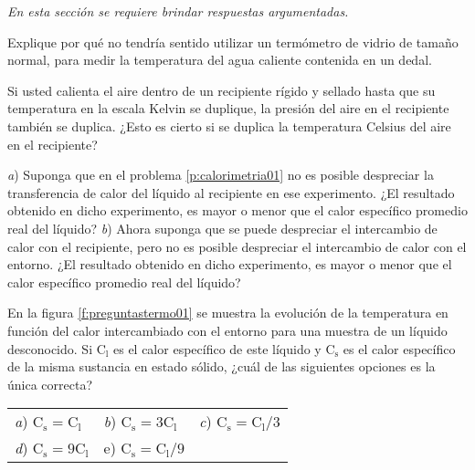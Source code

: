 \textit{En esta sección se requiere brindar respuestas argumentadas.}
\setcounter{figure}{0}
%
\begin{Exercise}
  Explique por qué no tendría sentido utilizar un termómetro de vidrio de tamaño normal, para medir la temperatura del agua caliente contenida en un dedal.
\end{Exercise}
%
\begin{Exercise}
  Si usted calienta el aire dentro de un recipiente rígido y sellado hasta que su temperatura en la escala Kelvin se duplique, la presión del aire en el recipiente también se duplica. ¿Esto es cierto si se duplica la temperatura Celsius del aire en el recipiente?
\end{Exercise}
%
\begin{Exercise}
  \textit{a}) Suponga que en el problema \ref{p:calorimetria01} no es posible despreciar la transferencia de calor del líquido al recipiente en ese experimento. ¿El resultado obtenido en dicho experimento, es mayor o menor que el calor específico promedio real del líquido? \textit{b}) Ahora suponga que se puede despreciar el intercambio de calor con el recipiente, pero no es posible despreciar el intercambio de calor con el entorno. ¿El resultado obtenido en dicho experimento, es mayor o menor que el calor específico promedio real del líquido?
\end{Exercise}
%
\begin{Exercise}\label{p:preguntastermo01}
  {}{}
  En la figura \ref{f:preguntastermo01} se muestra la evolución de la temperatura en función del calor intercambiado con el entorno para una muestra de un líquido desconocido. Si $\text{C}_{\text{l}}$ es el calor específico de este líquido y $\text{C}_{\text{s}}$ es el calor específico de la misma sustancia en estado sólido, ¿cuál de las siguientes opciones es la única correcta?\\
\renewcommand{\arraystretch}{1.5}
  \begin{tabular}{p{2.5cm} p{2.5cm} p{2.5cm}}
     \textit{a}) $\text{C}_{\text{s}}=\text{C}_{\text{l}}$ & \textit{b}) $\text{C}_{\text{s}}=3\text{C}_{\text{l}}$ & \textit{c}) $\text{C}_{\text{s}}=\text{C}_{\text{l}}/3$ \\
     \textit{d}) $\text{C}_{\text{s}}=9\text{C}_{\text{l}}$ & e) $\text{C}_{\text{s}}=\text{C}_{\text{l}}/9$ \\
  \end{tabular} \\
\end{Exercise}
